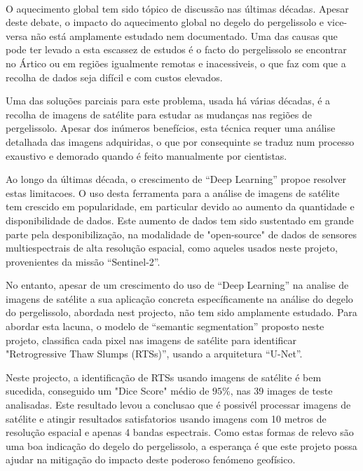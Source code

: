 
\paragraph{}
O aquecimento global tem sido tópico de discussão nas últimas décadas. Apesar deste debate, o impacto do aquecimento global no degelo do pergelissolo e vice-versa não está amplamente estudado nem documentado. Uma das causas que pode ter levado a esta escassez de estudos é o facto do pergelissolo se encontrar no Ártico ou em regiões igualmente remotas e inacessiveis, o que faz com que a recolha de dados seja difícil e com custos elevados.

Uma das soluções parciais para este problema, usada há várias décadas, é a recolha de imagens de satélite para estudar as mudanças nas regiões de pergelissolo. Apesar dos inúmeros benefícios, esta técnica requer uma análise detalhada das imagens adquiridas, o que por consequinte se traduz num processo exaustivo e demorado quando é feito manualmente por cientistas. 

Ao longo da últimas década, o crescimento de “Deep Learning” propoe resolver estas limitacoes. O uso desta ferramenta para a análise de imagens de satélite tem crescido em popularidade, em particular devido ao aumento da quantidade e disponibilidade de dados. Este aumento de dados tem sido sustentado em grande parte pela desponibilização, na modalidade de "open-source" de dados de sensores multiespectrais de alta resolução espacial, como aqueles usados neste projeto, provenientes da missão “Sentinel-2”.


No entanto, apesar de um crescimento do uso de “Deep Learning” na analise de imagens de satélite a sua aplicação concreta  específicamente na análise do degelo do pergelissolo, abordada nest projecto, não tem sido amplamente estudado. Para abordar esta lacuna, o modelo de “semantic segmentation” proposto neste projeto, classifica cada pixel nas imagens de satélite para identificar "Retrogressive Thaw Slumps (RTSs)”, usando a arquitetura “U-Net”.

Neste projecto, a identificação de RTSs usando imagens de satélite é bem sucedida, conseguido um "Dice Score" médio de $95\%$, nas 39 images de teste analisadas. Este resultado levou a conclusao que é possivél processar imagens de satélite e atingir resultados satisfatorios usando imagens com 10 metros de resolução espacial e apenas 4 bandas espectrais. Como estas formas de relevo são uma boa indicação do degelo do pergelissolo, a esperança é que este projeto possa ajudar na mitigação do impacto deste poderoso fenómeno geofísico.



